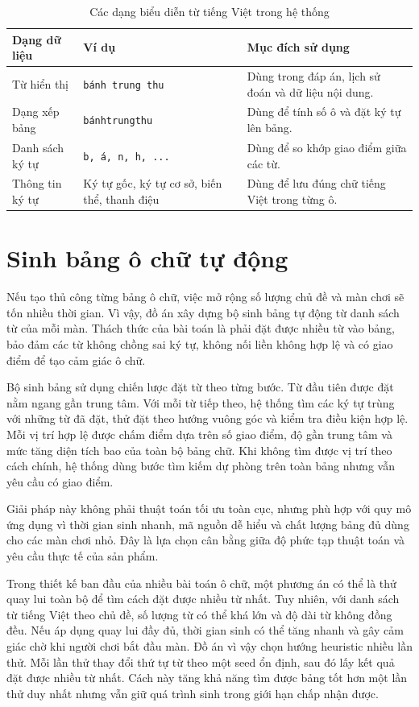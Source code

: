 \documentclass[../DoAn.tex]{subfiles}
\begin{document}
\begin{table}[H]
\centering
\begin{tabularx}{\textwidth}{|>{\RaggedRight\arraybackslash}p{3.3cm}|>{\RaggedRight\arraybackslash}p{4.1cm}|>{\RaggedRight\arraybackslash}X|}
\hline
\textbf{Dạng dữ liệu} & \textbf{Ví dụ} & \textbf{Mục đích sử dụng} \\ \hline
Từ hiển thị & \texttt{bánh trung thu} & Dùng trong đáp án, lịch sử đoán và dữ liệu nội dung. \\ \hline
Dạng xếp bảng & \texttt{bánhtrungthu} & Dùng để tính số ô và đặt ký tự lên bảng. \\ \hline
Danh sách ký tự & \texttt{b, á, n, h, ...} & Dùng để so khớp giao điểm giữa các từ. \\ \hline
Thông tin ký tự & Ký tự gốc, ký tự cơ sở, biến thể, thanh điệu & Dùng để lưu đúng chữ tiếng Việt trong từng ô. \\ \hline
\end{tabularx}
\caption{Các dạng biểu diễn từ tiếng Việt trong hệ thống}
\label{table:vietnamese_word_representation}
\end{table}

\section{Sinh bảng ô chữ tự động}
Nếu tạo thủ công từng bảng ô chữ, việc mở rộng số lượng chủ đề và màn chơi sẽ tốn nhiều thời gian. Vì vậy, đồ án xây dựng bộ sinh bảng tự động từ danh sách từ của mỗi màn. Thách thức của bài toán là phải đặt được nhiều từ vào bảng, bảo đảm các từ không chồng sai ký tự, không nối liền không hợp lệ và có giao điểm để tạo cảm giác ô chữ.

Bộ sinh bảng sử dụng chiến lược đặt từ theo từng bước. Từ đầu tiên được đặt nằm ngang gần trung tâm. Với mỗi từ tiếp theo, hệ thống tìm các ký tự trùng với những từ đã đặt, thử đặt theo hướng vuông góc và kiểm tra điều kiện hợp lệ. Mỗi vị trí hợp lệ được chấm điểm dựa trên số giao điểm, độ gần trung tâm và mức tăng diện tích bao của toàn bộ bảng chữ. Khi không tìm được vị trí theo cách chính, hệ thống dùng bước tìm kiếm dự phòng trên toàn bảng nhưng vẫn yêu cầu có giao điểm.

Giải pháp này không phải thuật toán tối ưu toàn cục, nhưng phù hợp với quy mô ứng dụng vì thời gian sinh nhanh, mã nguồn dễ hiểu và chất lượng bảng đủ dùng cho các màn chơi nhỏ. Đây là lựa chọn cân bằng giữa độ phức tạp thuật toán và yêu cầu thực tế của sản phẩm.

Trong thiết kế ban đầu của nhiều bài toán ô chữ, một phương án có thể là thử quay lui toàn bộ để tìm cách đặt được nhiều từ nhất. Tuy nhiên, với danh sách từ tiếng Việt theo chủ đề, số lượng từ có thể khá lớn và độ dài từ không đồng đều. Nếu áp dụng quay lui đầy đủ, thời gian sinh có thể tăng nhanh và gây cảm giác chờ khi người chơi bắt đầu màn. Đồ án vì vậy chọn hướng heuristic nhiều lần thử. Mỗi lần thử thay đổi thứ tự từ theo một seed ổn định, sau đó lấy kết quả đặt được nhiều từ nhất. Cách này tăng khả năng tìm được bảng tốt hơn một lần thử duy nhất nhưng vẫn giữ quá trình sinh trong giới hạn chấp nhận được.
\end{document}
